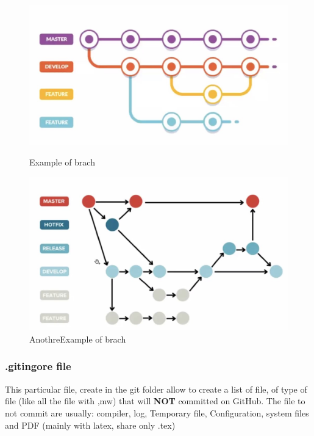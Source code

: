 \documentclass{report}
\begin{document}
\begin{figure} [H]
    \centering
    \begin{minipage}{0.4\textwidth}
        \centering
        \includegraphics*[scale=0.35]{img/branches.jpg}
        \caption{Example of brach}
        \label{branch}
    \end{minipage}
    \begin{minipage}{0.4\textwidth}
        \centering
        \includegraphics*[scale=0.35]{img/branches2.jpg}
        \caption{AnothreExample of brach}
        \label{branch2}
    \end{minipage}
\end{figure}

\subsubsection{.gitingore file}
This particular file, create in the git folder allow to create a list of file, of type of file (like all the file with ,mw) that will \textbf{NOT} committed on GitHub. 
The file to not commit are usually: compiler, log, Temporary file, Configuration, system files and PDF (mainly with latex, share only .tex)
\end{document}
